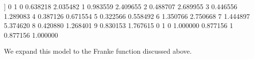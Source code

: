 \documentclass[letterpaper,10pt,english]{sphinxmanual}
\begin{document}
\begin{sphinxVerbatim}[commandchars=\\\{\}]
[[\PYGZhy{}0.63821798 \PYGZhy{}2.03548189]
 [ 0.98355854  2.40965456]
 [ 0.48870683  2.68995497]
 [ 0.44655566  1.28908336]
 [ 0.3871261  \PYGZhy{}0.67155367]
 [\PYGZhy{}0.32256574 \PYGZhy{}0.55849157]
 [ 1.3507663   2.75066843]
 [\PYGZhy{}1.44489727 \PYGZhy{}5.37462032]
 [\PYGZhy{}0.42087991  1.26840089]
 [\PYGZhy{}0.83015254 \PYGZhy{}1.76761477]]
          0         1
0 \PYGZhy{}0.638218 \PYGZhy{}2.035482
1  0.983559  2.409655
2  0.488707  2.689955
3  0.446556  1.289083
4  0.387126 \PYGZhy{}0.671554
5 \PYGZhy{}0.322566 \PYGZhy{}0.558492
6  1.350766  2.750668
7 \PYGZhy{}1.444897 \PYGZhy{}5.374620
8 \PYGZhy{}0.420880  1.268401
9 \PYGZhy{}0.830153 \PYGZhy{}1.767615
          0         1
0  1.000000  0.877156
1  0.877156  1.000000
\end{sphinxVerbatim}

We expand this model to the Franke function discussed above.
\end{document}
